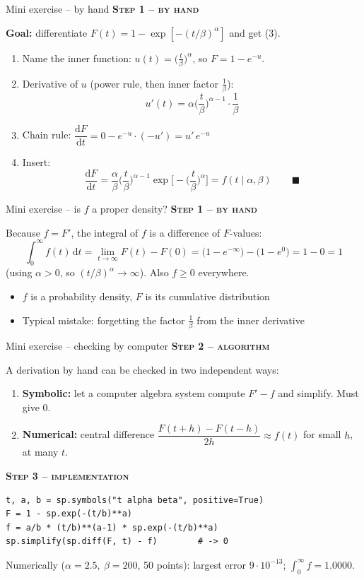 \documentclass[aspectratio=169,11pt]{beamer}
\newcommand{\stage}[2]{{\color{#1}\bfseries\small\textsc{#2}}\par\smallskip}
\newcommand{\Byhand}{\stage{hand}{Step 1 -- by hand}}
\newcommand{\Algo}{\stage{algo}{Step 2 -- algorithm}}
\newcommand{\Impl}{\stage{impl}{Step 3 -- implementation}}
\begin{document}
\begin{frame}{Mini exercise -- by hand}
\Byhand
\textbf{Goal:} differentiate $F(t)=1-\exp[-(t/\beta)^\alpha]$ and get (3).
\begin{enumerate}
\item Name the inner function: $u(t)=\big(\tfrac t\beta\big)^{\alpha}$, so $F=1-e^{-u}$.
\item Derivative of $u$ (power rule, then inner factor $\tfrac1\beta$):
\[u'(t)=\alpha\Big(\frac t\beta\Big)^{\alpha-1}\cdot\frac1\beta\]
\item Chain rule: $\dfrac{\mathrm dF}{\mathrm dt}=0-e^{-u}\cdot(-u')=u'\,e^{-u}$
\item Insert:
\[\frac{\mathrm dF}{\mathrm dt}=\frac\alpha\beta\Big(\frac t\beta\Big)^{\alpha-1}\exp\!\Big[-\Big(\frac t\beta\Big)^{\alpha}\Big]=f(t\mid\alpha,\beta)\qquad\blacksquare\]
\end{enumerate}
\end{frame}

\begin{frame}{Mini exercise -- is $f$ a proper density?}
\Byhand
Because $f=F'$, the integral of $f$ is a difference of $F$-values:
\[
\int_0^\infty f(t)\,\mathrm dt=\lim_{t\to\infty}F(t)-F(0)
=\big(1-e^{-\infty}\big)-\big(1-e^{0}\big)=1-0=1
\]
(using $\alpha>0$, so $(t/\beta)^\alpha\to\infty$). Also $f\ge0$ everywhere.
\medskip
\begin{itemize}
\item[$\Rightarrow$] $f$ is a probability density, $F$ is its cumulative distribution
\item Typical mistake: forgetting the factor $\tfrac1\beta$ from the inner derivative
\end{itemize}
\end{frame}

\begin{frame}[fragile]{Mini exercise -- checking by computer}\small
\Algo
A derivation by hand can be checked in two independent ways:
\begin{enumerate}
\item \textbf{Symbolic:} let a computer algebra system compute $F'-f$ and simplify. Must give $0$.
\item \textbf{Numerical:} central difference $\dfrac{F(t+h)-F(t-h)}{2h}\approx f(t)$ for small $h$, at many $t$.
\end{enumerate}
\Impl
\begin{lstlisting}
t, a, b = sp.symbols("t alpha beta", positive=True)
F = 1 - sp.exp(-(t/b)**a)
f = a/b * (t/b)**(a-1) * sp.exp(-(t/b)**a)
sp.simplify(sp.diff(F, t) - f)        # -> 0
\end{lstlisting}
\small Numerically ($\alpha=2.5,\ \beta=200$, 50 points): largest error $9\cdot10^{-13}$; $\int_0^\infty f=1.0000$.
\end{frame}
\end{document}
